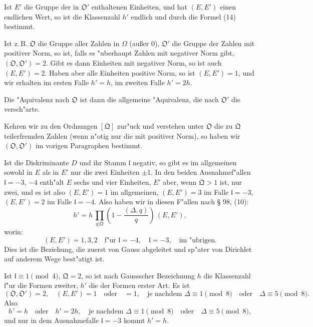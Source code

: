 \documentclass[12pt,a4paper]{article}
\theoremstyle{plain}
\begin{document}
Ist $E'$ die Gruppe der in $\mathfrak{O}'$ enthaltenen Einheiten, und hat $(E, E')$ einen endlichen Wert, so ist die Klassenzahl $h'$ endlich und durch die Formel (14) bestimmt.

Ist z.\,B. $\mathfrak{O}$ die Gruppe aller Zahlen in $\Omega$ (au\ss er 0), $\mathfrak{O}'$ die Gruppe der Zahlen mit positiver Norm, so ist, falls es "uberhaupt Zahlen mit negativer Norm gibt, $(\mathfrak{O}, \mathfrak{O}') = 2$. Gibt es dann Einheiten mit negativer Norm, so ist auch $(E, E') = 2$. Haben aber alle Einheiten positive Norm, so ist $(E, E') = 1$, und wir erhalten im ersten Falle $h' = h$, im zweiten Falle $h' = 2h$.

Die "Aquivalenz nach $\mathfrak{O}$ ist dann die allgemeine "Aquivalenz, die nach $\mathfrak{O}'$ die versch"arte.

Kehren wir zu den Ordnungen $[\mathfrak{Q}]$ zur"uck und verstehen unter $\mathfrak{O}$ die zu $\mathfrak{Q}$ teilerfremden Zahlen (wenn n"otig nur die mit positiver Norm), so haben wir $(\mathfrak{O}, \mathfrak{O}')$ im vorigen Paragraphen bestimmt.

Ist die Diskriminante $D$ und ihr Stamm $\mathfrak{l}$ negativ, so gibt es im allgemeinen sowohl in $E$ als in $E'$ nur die zwei Einheiten $\pm 1$. In den beiden Ausnahmef"allen $\mathfrak{l} = -3$, $-4$ enth"alt $E$ sechs und vier Einheiten, $E'$ aber, wenn $\mathfrak{Q} > 1$ ist, nur zwei, und es ist also $(E, E') = 1$ im allgemeinen, $(E, E') = 3$ im Falle $\mathfrak{l} = -3$, $(E, E') = 2$ im Falle $\mathfrak{l} = -4$. Also haben wir in diesen F"allen nach \S{} 98, (10):
\begin{equation}
h' = h\,\prod_{q|\mathfrak{Q}}\left(1 - \frac{(\Delta, q)}{q}\right)\,(E, E'),
\tag{15}
\end{equation}
worin:
\begin{equation}
(E, E') = 1, 3, 2\quad \text{f"ur } \mathfrak{l} = -4,\quad \mathfrak{l} = -3,\quad \text{im "ubrigen}.
\tag{16}
\end{equation}
Dies ist die Beziehung, die zuerst von Gauss abgeleitet und sp"ater von Dirichlet auf anderem Wege best"atigt ist.

Ist $\mathfrak{l} \equiv 1 \pmod{4}$, $\mathfrak{Q} = 2$, so ist nach Gaussscher Bezeichnung $h$ die Klassenzahl f"ur die Formen zweiter, $h'$ die der Formen erster Art. Es ist
\[
(\mathfrak{O}, \mathfrak{O}') = 2,\quad (E, E') = 1\quad \text{oder}\quad = 1,\quad \text{je nachdem } \Delta \equiv 1 \pmod{8}\quad \text{oder}\quad \Delta \equiv 5 \pmod{8}.
\]
Also
\[
h' = h\quad \text{oder}\quad h' = 2h,\quad \text{je nachdem } \Delta \equiv 1 \pmod{8}\quad \text{oder}\quad \Delta \equiv 5 \pmod{8},
\]
und nur in dem Ausnahmefalle $\mathfrak{l} = -3$ kommt $h' = h$.
\end{document}
